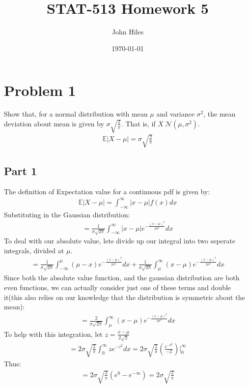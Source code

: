 \documentclass{article}
\title{STAT-513 Homework 5}
\author{John Hiles}
\date\today
\begin{document}
\maketitle %


\section*{Problem 1}
Show that, for a normal distribution with mean $\mu$ and variance $\sigma^2$, the mean deviation about mean is given by $\sigma\sqrt{\frac{2}{\pi}}$. That is, if $X~\mathcal{N}(\mu,\sigma^2)$.
\begin{align*}
\mathbb{E}|X-\mu|=\sigma\sqrt{\frac{2}{\pi}}
\end{align*}
\subsection*{Part 1}
The definition of Expectation value for a continuous pdf is given by:
\begin{align*}
\mathbb{E}|X-\mu|=\int_{-\infty}^{\infty} |x-\mu| f(x) dx
\end{align*}
Substituting in the Gaussian distribution:
\begin{align*}
= \frac{1}{\sigma\sqrt{2\pi}} \int_{-\infty}^{\infty} |x-\mu| e^{-\frac{(x-\mu)^2}{2\sigma^2}} dx
\end{align*}
To deal with our absolute value, lets divide up our integral into two seperate integrals, divided at $\mu$.
\begin{align*}
= \frac{1}{\sigma\sqrt{2\pi}} \int_{-\infty}^{\mu} (\mu-x) e^{-\frac{(x-\mu)^2}{2\sigma^2}} dx + \frac{1}{\sigma\sqrt{2\pi}} \int_{\mu}^{\infty} (x-\mu) e^{-\frac{(x-\mu)^2}{2\sigma^2}} dx
\end{align*}
Since both the absolute value function, and the gaussian distribution are both even functions, we can actually consider just one of these terms and double it(this also relies on our knowledge that the distribution is symmetric about the mean):
\begin{align*}
= \frac{2}{\sigma\sqrt{2\pi}} \int_{\mu}^{\infty} (x-\mu) e^{-\frac{(x-\mu)^2}{2\sigma^2}} dx
\end{align*}
To help with this integration, let $z=\frac{x-\mu}{2\sqrt{2}}$
\begin{align*}
= 2 \sigma \sqrt{\frac{2}{\pi}} \int_{0}^{\infty} z e^{-z^2} dx = 2 \sigma \sqrt{\frac{2}{\pi}} (\frac{e^{-b^2}}{-2}) |_{0}^{\infty}
\end{align*}
Thus:
\begin{align*}
\boxed{ = 2 \sigma \sqrt{\frac{2}{\pi}} (e^0-e^{-\infty}) = 2 \sigma \sqrt{\frac{2}{\pi}} }
\end{align*}
\end{document}

